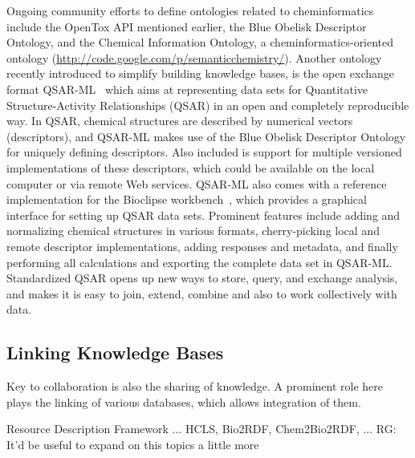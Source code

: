 \documentclass[11pt]{book}
\newcommand{\rg}[1]{{\color{red} RG: #1}}
\begin{document}
Ongoing community efforts to define ontologies related to cheminformatics include
the OpenTox API mentioned earlier, the Blue Obelisk Descriptor Ontology, and the
Chemical Information Ontology, a cheminformatics-oriented ontology
(\url{http://code.google.com/p/semanticchemistry/}). Another ontology
recently introduced to simplify building knowledge bases, is
the open exchange format QSAR-ML~\cite{Spjuth:2010fk} which aims at representing data sets
for Quantitative Structure-Activity Relationships (QSAR) in an open and completely
reproducible way. In QSAR, chemical structures are described by numerical vectors
(descriptors), and QSAR-ML makes use of the Blue Obelisk Descriptor Ontology for
uniquely defining descriptors. Also included is support for multiple versioned
implementations of these descriptors, which could be available on the local computer
or via remote Web services. QSAR-ML also comes with a reference implementation for
the Bioclipse workbench~\cite{Spjuth2009,Spjuth2007}, which provides a graphical
interface for setting up QSAR data sets. Prominent features include adding and
normalizing chemical structures in various formats, cherry-picking local and
remote descriptor implementations, adding responses and metadata, and finally
performing all calculations and exporting the complete data set in QSAR-ML.
Standardized QSAR opens up new ways to store, query, and exchange analysis,
and makes it is easy to join, extend, combine and also to work collectively with data.



\subsection{Linking Knowledge Bases}

Key to collaboration is also the sharing of knowledge. A prominent role here
plays the linking of various databases, which allows integration of them.

Resource Description Framework ... HCLS, Bio2RDF, Chem2Bio2RDF,
... \rg{It'd be useful to expand on this topics a little more}
\end{document}
